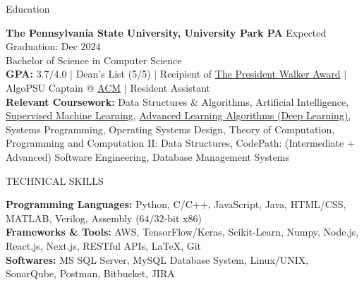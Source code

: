 \documentclass{resume} %
\begin{document}

\begin{rSection}{Education}

{\bf The Pennsylvania State University, University Park PA} \hfill {Expected Graduation: Dec $2024$}\\
{Bachelor of Science in Computer Science}\\
{\bf GPA:} $3.7/4.0$ $\vert$ Dean's List (5/5) $\vert$ Recipient of \href{https://awardsrecognition.psu.edu/student/undergraduate-scholastic-awards/}{The President Walker Award} $\vert$ AlgoPSU Captain @ \href{https://acm.psu.edu/algopsu/}{ACM} $\vert$ Resident Assistant\\
{\bf Relevant Coursework:} Data Structures \& Algorithms, Artificial Intelligence, \href{https://www.coursera.org/account/accomplishments/verify/JYX5UB5YP4YD}{Supervised Machine Learning}, \href{https://www.coursera.org/account/accomplishments/records/PBF4QN2KQL4Z}{Advanced Learning Algorithms (Deep Learning)}, Systems Programming, Operating Systems Design, Theory of Computation, Programming and Computation II: Data Structures, CodePath: (Intermediate + Advanced) Software Engineering, Database Management Systems
\end{rSection}


\begin{rSection}{TECHNICAL SKILLS}

{\bf Programming Languages:} Python, C/C++, JavaScript, Java, HTML/CSS, MATLAB, Verilog, Assembly ($64/32$-bit x$86$)\\
{\bf Frameworks \& Tools:} AWS, TensorFlow/Keras, Scikit-Learn, Numpy, Node.js, React.js, Next.js, RESTful APIs, \LaTeX, Git\\
{\bf Softwares:} MS SQL Server, MySQL Database System, Linux/UNIX, SonarQube, Postman, Bitbucket, JIRA

\end{rSection}
\end{document}
